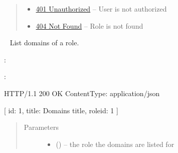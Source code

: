 \documentclass[letterpaper,10pt,english]{sphinxmanual}
\begin{document}
\begin{fulllineitems}
\begin{quote}
\begin{description}
\begin{itemize}
\item {} 
\href{http://www.w3.org/Protocols/rfc2616/rfc2616-sec10.html\#sec10.4.2}{401 Unauthorized} -- User is not authorized

\item {} 
\href{http://www.w3.org/Protocols/rfc2616/rfc2616-sec10.html\#sec10.4.5}{404 Not Found} -- Role is not found

\end{itemize}

\end{description}\end{quote}

\end{fulllineitems}



\begin{fulllineitems}
\label{\detokenize{resources/role:get--roles-(role_id)-domains}}~
List domains of a role.

:

\begin{sphinxVerbatim}[commandchars=\\\{\}]
  
 
 
\end{sphinxVerbatim}

:

\begin{sphinxVerbatim}[commandchars=\\\{\}]
HTTP/1.1 200 OK
Content\PYGZhy{}Type: application/json

[
    \PYGZob{}
        \PYGZsq{}id\PYGZsq{}: 1,
        \PYGZsq{}title\PYGZsq{}: \PYGZsq{}Domain\PYGZsq{}s title\PYGZsq{},
        \PYGZsq{}role\PYGZus{}id\PYGZsq{}: 1
    \PYGZcb{}
]
\end{sphinxVerbatim}
\begin{quote}\begin{description}
\item[{Parameters}] \leavevmode\begin{itemize}
\item {} 
 () -- the role the domains are listed for


\end{itemize}
\end{description}
\end{quote}
\end{fulllineitems}
\end{document}
